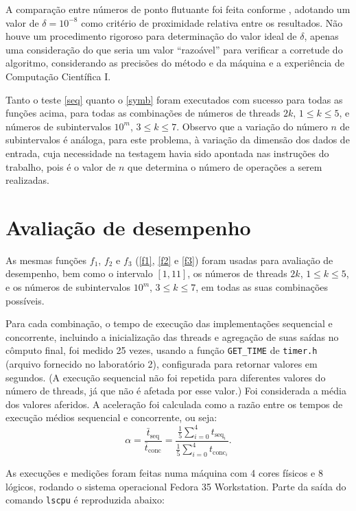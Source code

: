 \documentclass{article}
\begin{document}
  A comparação entre números de ponto flutuante foi feita conforme \cite{float}, adotando um valor de $\delta = 10^{-8}$ como critério de proximidade relativa entre os resultados. Não houve um procedimento rigoroso para determinação do valor ideal de $\delta$, apenas uma consideração do que seria um valor ``razoável'' para verificar a corretude do algoritmo, considerando as precisões do método e da máquina e a experiência de Computação Científica I. 
  
  Tanto o teste \ref{seq} quanto o \ref{symb} foram executados com sucesso para todas as funções acima, para todas as combinações de números de threads $2k$, $1 \leq k \leq 5$, e números de subintervalos $10^m$, $3 \leq k \leq 7$. Observo que a variação do número $n$ de subintervalos é análoga, para este problema, à variação da dimensão dos dados de entrada, cuja necessidade na testagem havia sido apontada nas instruções do trabalho, pois é o valor de $n$ que determina o número de operações a serem realizadas.

  \section{Avaliação de desempenho} \label{perf}

  As mesmas funções $f_1$, $f_2$ e $f_3$ (\eqref{f1}, \eqref{f2} e \eqref{f3}) foram usadas para avaliação de desempenho, bem como o intervalo $[1, 11]$, os números de threads $2k$, $1 \leq k \leq 5$, e os números de subintervalos $10^m$, $3 \leq k \leq 7$, em todas as suas combinações possíveis.

  Para cada combinação, o tempo de execução das implementações sequencial e concorrente, incluindo a inicialização das threads e agregação de suas saídas no cômputo final, foi medido 25 vezes, usando a função \texttt{GET\_TIME} de \texttt{timer.h} (arquivo fornecido no laboratório 2), configurada para retornar valores em segundos. (A execução sequencial não foi repetida para diferentes valores do número de threads, já que não é afetada por esse valor.) Foi considerada a média dos valores aferidos. A aceleração foi calculada como a razão entre os tempos de execução médios sequencial e concorrente, ou seja:
  \begin{equation} \label{acc}
    \alpha = \frac{\bar{t}_{\text{seq}}}{\bar{t}_{\text{conc}}} = \frac{\frac{1}{5} \sum_{i=0}^4 t_{\text{seq}_i}}{\frac{1}{5} \sum_{i=0}^4 t_{\text{conc}_i}}.
  \end{equation}

  As execuções e medições foram feitas numa máquina com 4 cores físicos e 8 lógicos, rodando o sistema operacional Fedora 35 Workstation. Parte da saída do comando \texttt{lscpu} é reproduzida abaixo:
\end{document}
